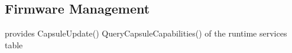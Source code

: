 \subsection{Firmware Management}


provides
CapsuleUpdate()
QueryCapsuleCapabilities()
of the runtime services table